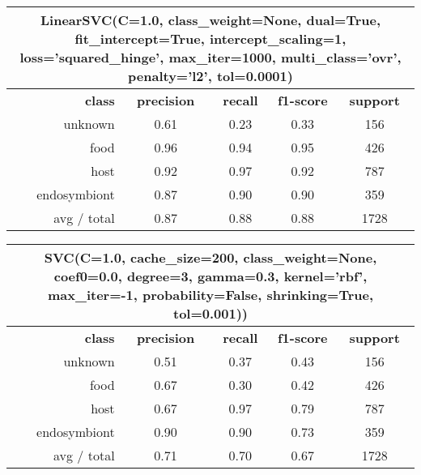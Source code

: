 \begin{table}
	\begin{tabular}{|r|c|c|c|c|}
		\hline
		\multicolumn{5}{c}{LinearSVC(C=1.0, class\_weight=None, dual=True, fit\_intercept=True,
			intercept\_scaling=1, loss='squared\_hinge', max\_iter=1000,
			multi\_class='ovr', penalty='l2', tol=0.0001)}\\
		\hline
		\textbf{class}		& \textbf{precision}  &  \textbf{recall}  & \textbf{f1-score}  &  \textbf{support} \\
		unknown   	&     0.61 	 &    0.23  &     0.33   &   156   \\
		food      	&    0.96 	 &   0.94   &    0.95   &   426   \\
		host      	&    0.92    &   0.97   &    0.92   &   787   \\
		endosymbiont&    0.87    &   0.90   &    0.90   &   359   \\
		\hline
		avg / total &   0.87    &   0.88   &    0.88   &   1728  \\
		\hline
	\end{tabular}
\end{table}


\begin{table}
	\begin{tabular}{|r|c|c|c|c|}
		\hline
		\multicolumn{5}{c}{SVC(C=1.0, cache\_size=200, class\_weight=None, coef0=0.0, degree=3, gamma=0.3,
			kernel='rbf', max\_iter=-1, probability=False,
			shrinking=True, tol=0.001))}\\
		\hline
		\textbf{class}		& \textbf{precision}  &  \textbf{recall}  & \textbf{f1-score}  &  \textbf{support} \\
		unknown   	&    0.51 	 &   0.37   &    0.43   &   156   \\
		food      	&    0.67 	 &   0.30   &    0.42   &   426   \\
		host      	&    0.67    &   0.97   &    0.79   &   787   \\
		endosymbiont&    0.90    &   0.90   &    0.73   &   359   \\
		\hline
		avg / total &    0.71    &   0.70   &    0.67   &   1728  \\
		\hline
	\end{tabular}
\end{table}


